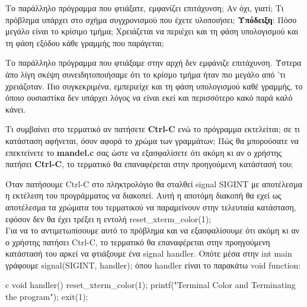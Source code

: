 \documentclass[12pt]{article}
\begin{document}
\begin{question}
Το παράλληλο πρόγραμμα που φτιάξατε, εμφανίζει επιτάχυνση; Αν όχι,
γιατί; Τι πρόβλημα υπάρχει στο σχήμα συγχρονισμού που έχετε υλοποιήσει; 
\textbf{Υπόδειξη}: Πόσο μεγάλο είναι το κρίσιμο τμήμα; Χρειάζεται να περιέχει
και τη φάση υπολογισμού και τη φάση εξόδου κάθε γραμμής που παράγεται;
\end{question}

Το παράλληλο πρόγραμμα που φτιάξαμε στην αρχή δεν εμφάνιζε επιτάχυνση. Ύστερα άπο λίγη
σκέψη συνειδητοποιήσαμε ότι το κρίσμο τμήμα ήταν πιο μεγάλο από 'τι χρειάζοταν.
Πιο συγκεκριμένα, εμπεριείχε και τη φάση υπολογισμού καθέ γραμμής, το όποιο ουσιαστίκα
δεν υπάρχει λόγος να είναι εκεί και περισσότερο κακό παρά καλό κάνει.

\begin{question}
Τι συμβαίνει στο τερματικό αν πατήσετε \textbf{Ctrl-C} ενώ το πρόγραμμα εκτελείται; 
σε τι κατάσταση αφήνεται, όσον αφορά το χρώμα των γραμμάτων;
Πώς θα μπορούσατε να επεκτείνετε το \textbf{mandel.c} σας ώστε να εξασφαλίσετε ότι 
ακόμη κι αν ο χρήστης πατήσει \textbf{Ctrl-C}, το τερματικό θα επαναφέρεται στην 
προηγούμενη κατάστασή του;
\end{question}

Όταν πατήσουμε Ctrl-C στο πληκτρολόγιο θα σταλθεί signal SIGINT με αποτέλεσμα η
εκτέλεση του προγράμματος να διακοπεί. Αυτή η αποτόμη διακοπή θα εχεί ως αποτέλεσμα
τα χρώματα του τερματικού να παραμείνουν στην τελευταία κατάσταση, εφόσον δεν θα έχει
τρέξει η εντολή reset\_xterm\_color(1);
\\
Για να το αντιμετωπίσουμε αυτό το πρόβλημα και να εξασφαλίσουμε ότι ακόμη κι αν ο χρήστης 
πατήσει Ctrl-C, το τερματικό θα επαναφέρεται στην προηγούμενη κατάστασή του αρκεί να
φτιάξουμε ένα signal handler. Οπότε μέσα στην int main γράφουμε signal(SIGINT, handler); 
όπου handler είναι το παρακάτω void function:

\begin{codeless}{c}
    void handler() 
    {
	    reset_xterm_color(1);
	    printf("\nReseting Terminal Color and Terminating the program\n");
	    exit(1);
    }
\end{codeless}
\end{document}
